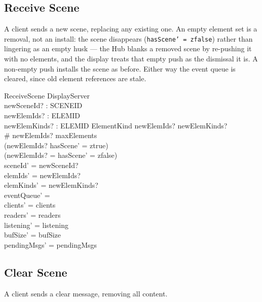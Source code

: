 \documentclass[a4paper,10pt,fleqn]{article}
\begin{document}
\subsection{Receive Scene}

A client sends a new scene, replacing any existing one. An empty element set is
a removal, not an install: the scene disappears (\texttt{hasScene' = zfalse})
rather than lingering as an empty husk --- the Hub blanks a removed scene by
re-pushing it with no elements, and the display treats that empty push as the
dismissal it is. A non-empty push installs the scene as before. Either way the
event queue is cleared, since old element references are stale.

\begin{schema}{ReceiveScene}
  \Delta DisplayServer \\
  newSceneId? : SCENEID \\
  newElemIds? : \power ELEMID \\
  newElemKinds? : ELEMID \pfun ElementKind
  \where
  newElemIds? \subseteq \dom newElemKinds? \\
  \# newElemIds? \leq maxElements \\
  (newElemIds? \neq \emptyset \implies hasScene' = ztrue) \\
  (newElemIds? = \emptyset \implies hasScene' = zfalse) \\
  sceneId' = newSceneId? \\
  elemIds' = newElemIds? \\
  elemKinds' = newElemKinds? \\
  eventQueue' = \emptyset \\
  clients' = clients \\
  readers' = readers \\
  listening' = listening \\
  bufSize' = bufSize \\
  pendingMsgs' = pendingMsgs
\end{schema}

\subsection{Clear Scene}

A client sends a clear message, removing all content.
\end{document}
